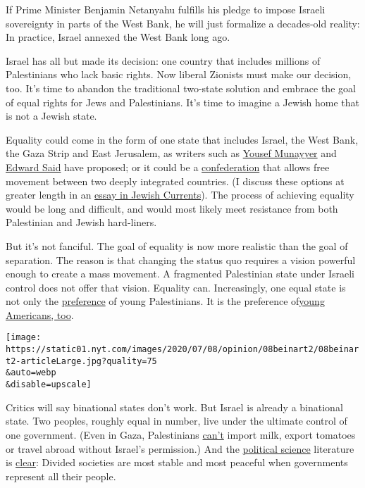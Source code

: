 If Prime Minister Benjamin Netanyahu fulfills his pledge to impose
Israeli sovereignty in parts of the West Bank, he will just formalize a
decades-old reality: In practice, Israel annexed the West Bank long ago.

Israel has all but made its decision: one country that includes millions
of Palestinians who lack basic rights. Now liberal Zionists must make
our decision, too. It's time to abandon the traditional two-state
solution and embrace the goal of equal rights for Jews and Palestinians.
It's time to imagine a Jewish home that is not a Jewish state.

Equality could come in the form of one state that includes Israel, the
West Bank, the Gaza Strip and East Jerusalem, as writers such as
\href{https://www.foreignaffairs.com/articles/israel/2019-10-15/there-will-be-one-state-solution}{Yousef
Munayyer} and
\href{https://www.nytimes.com/1999/01/10/magazine/the-one-state-solution.html}{Edward
Said} have proposed; or it could be a
\href{https://www.alandforall.org/english/?d=ltr}{confederation} that
allows free movement between two deeply integrated countries. (I discuss
these options at greater length in an
\href{https://jewishcurrents.org/yavne-a-jewish-case-for-equality-in-israel-palestine/}{essay
in Jewish Currents}). The process of achieving equality would be long
and difficult, and would most likely meet resistance from both
Palestinian and Jewish hard-liners.

But it's not fanciful. The goal of equality is now more realistic than
the goal of separation. The reason is that changing the status quo
requires a vision powerful enough to create a mass movement. A
fragmented Palestinian state under Israeli control does not offer that
vision. Equality can. Increasingly, one equal state is not only the
\href{https://www.ft.com/content/5c7ed0b2-fe74-11e6-96f8-3700c5664d30}{preference}
of young Palestinians. It is the preference
of\href{https://sadat.umd.edu/sites/sadat.umd.edu/files/UMCIP\%20Questionnaire\%20Sep\%20to\%20Oct\%202018.pdf}{young
Americans, too}.

\texttt{[image: https://static01.nyt.com/images/2020/07/08/opinion/08beinart2/08beinart2-articleLarge.jpg?quality=75\\\&auto=webp\\\&disable=upscale]}

Critics will say binational states don't work. But Israel is already a
binational state. Two peoples, roughly equal in number, live under the
ultimate control of one government. (Even in Gaza, Palestinians
\href{https://gisha.org/publication/1649}{can't} import milk, export
tomatoes or travel abroad without Israel's permission.) And the
\href{https://journals.sagepub.com/doi/10.1177/019251219301400203}{political
science} literature is
\href{https://www.jstor.org/stable/40646192?seq=1}{clear}: Divided
societies are most stable and most peaceful when governments represent
all their people.

